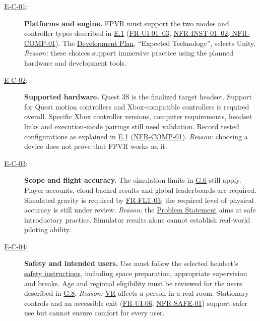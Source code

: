 \documentclass[12pt]{article}
\begin{document}
\begin{description}
\item[{\hyperref[et-platform]{E-C-01}:}]\label{ec-platform}
\textbf{Platforms and engine.}
FPVR must support the two modes and controller types described in
\hyperref[e1]{E.1} (\hyperref[sec:s2-interface]{FR-UI-01--03},
\hyperref[sec:s2-nfr]{NFR-INST-01--02, NFR-COMP-01}).
The \href{../DevelopmentPlan/DevelopmentPlan.tex}{Development Plan},
``Expected Technology'', selects Unity.
\textit{Reason:} these choices support immersive practice using the planned
hardware and development tools.

\item[{\hyperref[et-platform]{E-C-02}:}]\label{ec-hardware}
\textbf{Supported hardware.}
Quest 3S is the finalized target headset. Support for Quest motion controllers
and Xbox-compatible controllers is required overall. Specific Xbox controller
versions, computer requirements, headset links and execution-mode pairings still
need validation. Record tested configurations as explained in
\hyperref[e1]{E.1} (\hyperref[sec:s2-nfr]{NFR-COMP-01}).
\textit{Reason:} choosing a device does not prove that FPVR works on it.

\item[{\hyperref[et-scope]{E-C-03}:}]\label{ec-scope}
\textbf{Scope and flight accuracy.}
The simulation limits in \hyperref[g6]{G.6} still apply. Player accounts,
cloud-backed results and global leaderboards are required. Simulated gravity is required by
\hyperref[sec:s2-flight]{FR-FLT-03}; the required level of physical accuracy is
still under review.
\textit{Reason:} the
\href{../ProblemStatementAndGoals/ProblemStatement.tex}{Problem Statement}
aims at safe introductory practice. Simulator results alone cannot establish
real-world piloting ability.

\item[{\hyperref[et-safety]{E-C-04}:}]\label{ec-safety}
\textbf{Safety and intended users.}
Use must follow the selected headset's
\hyperref[es-meta-safety]{safety instructions}, including space preparation,
appropriate supervision and breaks. Age and regional eligibility must be
reviewed for the users described in \hyperref[g8]{G.8}.
\textit{Reason:} \hyperlink{glos:VR}{VR} affects a person in a real room. Stationary controls and an
accessible exit (\hyperref[sec:s2-interface]{FR-UI-06},
\hyperref[sec:s2-nfr]{NFR-SAFE-01}) support safer use but cannot ensure comfort
for every user.


\end{description}
\end{document}
